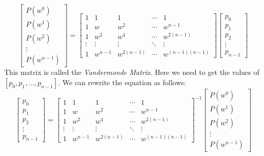 \documentclass[28]{report}
\begin{document}
\begin{equation*}
  \begin{bmatrix}
    P(w^0) \\
    P(w^1) \\
    P(w^2) \\
    \vdots \\
    P(w^{n-1})
  \end{bmatrix} 
    = 
    \begin{bmatrix} 
      1     & 1     & 1     & \cdots & 1    \\ 
      1     & w     & w^2   & \cdots & w^{n-1} \\ 
      1     & w^2   & w^4   & \cdots & w^{2(n-1)} \\
      \vdots & \vdots & \vdots  & \ddots & \vdots \\
      1 & w^{n-1} & w^{2(n-1)}  & \cdots & w^{(n-1)(n-1)} 
    \end{bmatrix} 
    \begin{bmatrix}
        p_0 \\
        p_1 \\
        p_2 \\
        \vdots \\
        p_{n-1}
    \end{bmatrix}
\end{equation*}
This matrix is called the \textit{Vandermonde Matrix}.
\newline
\newline
Here we need to get the values of $[p_0, p_1, ... , p_{n-1}]$. We can rewrite the equation as follows:
\begin{equation*}
    \begin{bmatrix}
        p_0 \\
        p_1 \\
        p_2 \\
        \vdots \\
        p_{n-1}
    \end{bmatrix}
    = 
    {\begin{bmatrix} 
      1     & 1     & 1     & \cdots & 1    \\ 
      1     & w     & w^2   & \cdots & w^{n-1} \\ 
      1     & w^2   & w^4   & \cdots & w^{2(n-1)} \\
      \vdots & \vdots & \vdots  & \ddots & \vdots \\
      1 & w^{n-1} & w^{2(n-1)}  & \cdots & w^{(n-1)(n-1)} 
    \end{bmatrix} }^{-1}
    \begin{bmatrix}
    P(w^0) \\
    P(w^1) \\
    P(w^2) \\
    \vdots \\
    P(w^{n-1})
  \end{bmatrix}     
\end{equation*}
\end{document}
